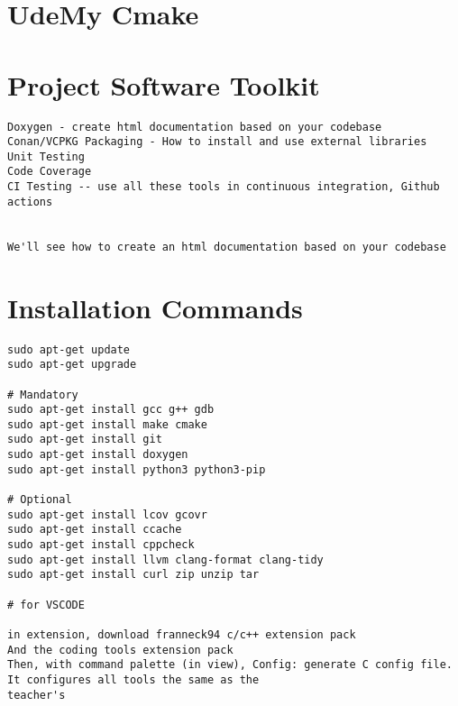 \section{UdeMy Cmake}


\section{Project Software Toolkit}

\begin{verbatim}
Doxygen - create html documentation based on your codebase
Conan/VCPKG Packaging - How to install and use external libraries
Unit Testing
Code Coverage 
CI Testing -- use all these tools in continuous integration, Github actions


We'll see how to create an html documentation based on your codebase
\end{verbatim}


\section{Installation Commands}

\begin{verbatim}
sudo apt-get update
sudo apt-get upgrade
 
# Mandatory
sudo apt-get install gcc g++ gdb
sudo apt-get install make cmake
sudo apt-get install git
sudo apt-get install doxygen
sudo apt-get install python3 python3-pip
 
# Optional
sudo apt-get install lcov gcovr
sudo apt-get install ccache
sudo apt-get install cppcheck
sudo apt-get install llvm clang-format clang-tidy
sudo apt-get install curl zip unzip tar

# for VSCODE

in extension, download franneck94 c/c++ extension pack
And the coding tools extension pack
Then, with command palette (in view), Config: generate C config file. It configures all tools the same as the 
teacher's
\end{verbatim}


